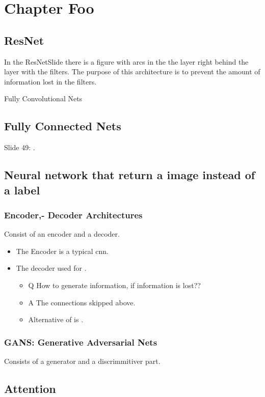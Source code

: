 \chapter{Chapter Foo}

\section{ResNet}

In the ResNetSlide there is a figure with  arcs in the the layer right behind the layer with the filters.
The purpose of this architecture is to prevent the amount of information lost in the filters.

Fully Convolutional Nets

\section{Fully Connected Nets}

Slide 49: .


\section{Neural network that return a image instead of a label}
\subsection{Encoder,- Decoder Architectures}

Consist of an encoder and a decoder.
\begin{itemize}
    \item The Encoder is a typical cnn.
    \item The decoder used for .

        \begin{itemize}
            \item Q\: How to generate information, if information is lost??
            \item A\: The  connections skipped above.
            \item Alternative of  is .
        \end{itemize}
\end{itemize}

\subsection{GANS: Generative Adversarial Nets}
    Consists of a generator and a discrimmitiver part.

\section{Attention}





